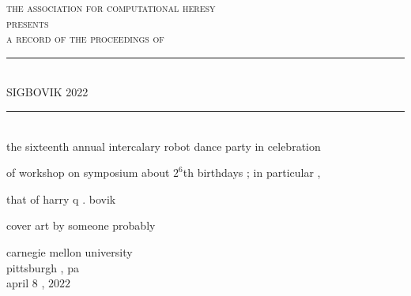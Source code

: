\documentclass{article}
\begin{document}
\setmainfont{Splotch.ttf}
\setsansfont{Birbaslo.ttf}

\newcommand{\HRule}{\rule{\linewidth}{0.5mm}}

\begin{titlepage}
\begin{center}

\textsc{\LARGE the association for computational heresy}\\[0.5cm]

\textsc{\large presents}\\[1cm]

\textsc{\Large a record of the proceedings of}\\[0.5cm]
\HRule \\[0.4cm]
{ \Huge \sf SIGBOVIK 2022 \\[0.4cm] }

\HRule \\[2cm]


the sixteenth annual intercalary robot dance party in celebration

of workshop on symposium about $2^6$th birthdays{ ;} in particular{ ,}

that of harry q{ .} bovik

\vfill

cover art by someone probably

\vfill

{\Large carnegie mellon university\\[0.25cm]
pittsburgh{ ,} pa\\[0.3cm]
april $8${ ,} $2022$}

\end{center}
\end{titlepage}
\end{document}
